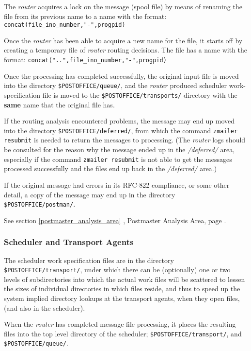 The {\em router\/} acquires a lock on the message (spool file) by means
of renaming the file from its previous name to a name with the format: 
{\tt concat(file\_ino\_number,"-",progpid)}

Once the {\em router\/} has been able to acquire a new name
for the file, it starts off by creating a temporary file of
{\em router\/} routing decisions.  The file has a name with the format:
{\tt concat("..",file\_ino\_number,"-",progpid)}

Once the processing has completed successfully, the original
input file is moved into the directory {\tt \$POSTOFFICE/queue/}, and
the {\em router\/} produced scheduler work-specification file is moved
to the {\tt \$POSTOFFICE/transports/} directory with the {\bf same}
name that the original file has.

If the routing analysis encountered problems, the message
may end up moved into the directory {\tt \$POSTOFFICE/deferred/}, from
which the command {\tt zmailer resubmit} is needed to return 
the messages to processing. (The {\em router\/} logs should be consulted 
for the reason why the message ended up in the {\em /deferred/\/} area,
especially if the command {\tt zmailer resubmit} is not able
to get the messages processed successfully and
the files end up back in the {\em /deferred/\/} area.)

If the original message had errors in its RFC-822 compliance,
or some other detail, a copy of the message may end up in the 
directory {\tt \$POSTOFFICE/postman/}.  

See 
section
\ref{postmaster_analysis_area}
, Postmaster Analysis Area, page 
\pageref{postmaster_analysis_area}.




\subsubsection{Scheduler and Transport Agents}



The scheduler work specification files are in the directory
{\tt \$POSTOFFICE/transport/}, under which there can be (optionally)
one or two levels of subdirectories into which the actual
work files will be scattered to lessen the sizes of individual
directories in which files reside, and thus to speed up the
system implied directory lookups at the transport agents, when
they open files, (and also in the scheduler).

When the {\em router\/} has completed message file processing, it places the
resulting files into the top level directory of the scheduler; 
{\tt \$POSTOFFICE/transport/}, and {\tt \$POSTOFFICE/queue/}.

